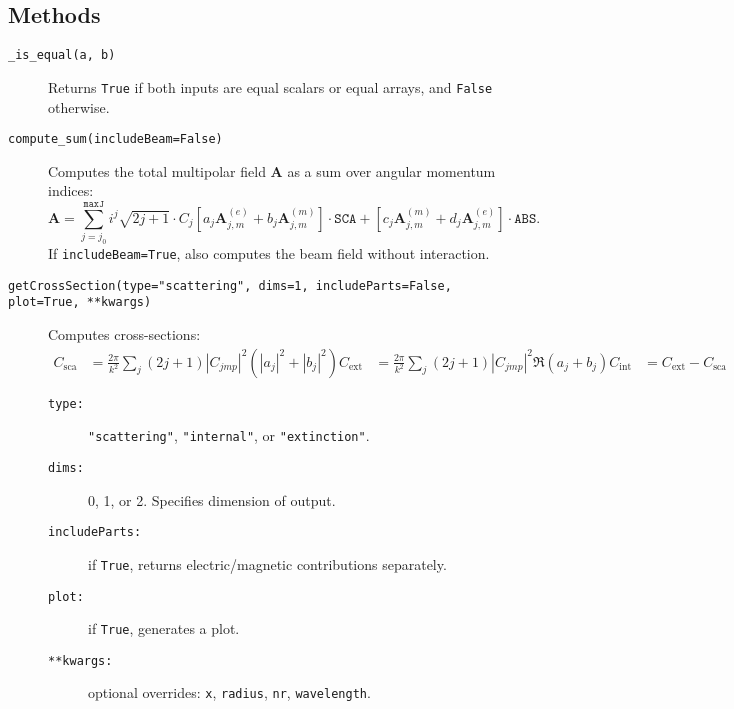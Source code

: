 \subsection{Methods}
\begin{description}
    \item[\texttt{\_is\_equal(a, b)}]
    Returns \texttt{True} if both inputs are equal scalars or equal arrays, and \texttt{False} otherwise.

    \item[\texttt{compute\_sum(includeBeam=False)}]
    Computes the total multipolar field \( \mathbf{A} \) as a sum over angular momentum indices:
    \begin{equation}
        \mathbf{A} = \sum_{j=j_0}^{\texttt{maxJ}} i^j \sqrt{2j+1} \cdot C_j \left[ a_j \mathbf{A}_{j,m}^{(e)} + b_j \mathbf{A}_{j,m}^{(m)} \right] \cdot \texttt{SCA} + \left[ c_j \mathbf{A}_{j,m}^{(m)} + d_j \mathbf{A}_{j,m}^{(e)} \right] \cdot \texttt{ABS}.
    \end{equation}
    If \texttt{includeBeam=True}, also computes the beam field without interaction.

    \item[\texttt{getCrossSection(type="scattering", dims=1, includeParts=False, plot=True, **kwargs)}]
    Computes cross-sections:
    \begin{align}
        C_{\text{sca}} &= \frac{2\pi}{k^2} \sum_j (2j+1) |C_{j m p}|^2 \left( |a_j|^2 + |b_j|^2 \right) 
        C_{\text{ext}} &= \frac{2\pi}{k^2} \sum_j (2j+1) |C_{j m p}|^2 \Re(a_j + b_j) 
        C_{\text{int}} &= C_{\text{ext}} - C_{\text{sca}}
    \end{align}
    \begin{description}
        \item[\texttt{type:}] \texttt{"scattering"}, \texttt{"internal"}, or \texttt{"extinction"}.
        \item[\texttt{dims:}] 0, 1, or 2. Specifies dimension of output.
        \item[\texttt{includeParts:}] if \texttt{True}, returns electric/magnetic contributions separately.
        \item[\texttt{plot:}] if \texttt{True}, generates a plot.
        \item[\texttt{**kwargs:}] optional overrides: \texttt{x}, \texttt{radius}, \texttt{nr}, \texttt{wavelength}.
    \end{description}


\end{description}
